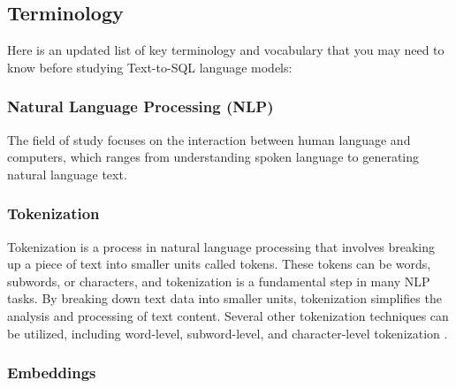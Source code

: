 \subsection{Terminology}

Here is an updated list of key terminology and vocabulary that you may need to know before studying Text-to-SQL language models:

\subsubsection{Natural Language Processing (NLP)}

The field of study focuses on the interaction between human language and computers, which ranges from understanding spoken language to generating natural language text.

\subsubsection{Tokenization}

Tokenization is a process in natural language processing that involves breaking up a piece of text into smaller units called tokens. These tokens can be words, subwords, or characters, and tokenization is a fundamental step in many NLP tasks. By breaking down text data into smaller units, tokenization simplifies the analysis and processing of text content. Several other tokenization techniques can be utilized, including word-level, subword-level, and character-level tokenization \cite{kumar2022deep}.

\subsubsection{Embeddings}

